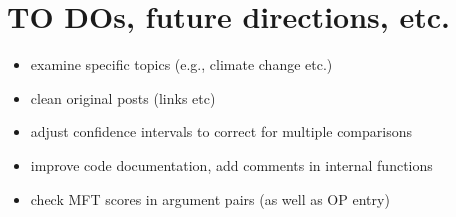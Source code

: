 \documentclass[12pt,]{article}
\providecommand{\tightlist}{%
\setlength{\itemsep}{0pt}\setlength{\parskip}{0pt}}
\begin{document}
\section{TO DOs, future directions,
etc.}\label{to-dos-future-directions-etc.}

\begin{itemize}
\tightlist
\item
  examine specific topics (e.g., climate change etc.)
\item
  clean original posts (links etc)
\item
  adjust confidence intervals to correct for multiple comparisons
\item
  improve code documentation, add comments in internal functions
\item
  check MFT scores in argument pairs (as well as OP entry)
\end{itemize}




\newpage
\singlespacing 

\end{document}
